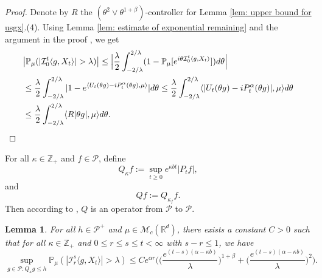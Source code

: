 \documentclass[12pt,a4paper]{amsart}
\theoremstyle{plain}
\newtheorem{lem}[thm]{Lemma}
\theoremstyle{definition}
\numberwithin{equation}{section}
\begin{document}
\begin{proof}
    Denote by $R$ the $(\theta^2\vee\theta^{1+\beta})$-controller for Lemma \ref{lem: upper bound for usgx}.(4).
    Using Lemma \ref{lem: estimate of exponential remaining} and the argument in the proof \cite[Theorem 3.3.6]{Durrett2010Probability}, we get
\begin{equation}\begin{split}
    &\big|\mathbb P_\mu (|\mathcal{I}_0^t\langle g,X_t\rangle| > \lambda)\big|
    \leq \Big|\frac{\lambda}{2}\int_{-2/\lambda}^{2/\lambda}(1 - \mathbb P_\mu[e^{i\theta \mathcal{I}_0^t\langle g,X_t\rangle}])d\theta\Big|
    \\&\leq \frac{\lambda}{2}\int_{-2/\lambda}^{2/\lambda}|1-e^{\langle U_t(\theta g)-iP^\alpha_t (\theta g),\mu \rangle}|d\theta
    \leq \frac{\lambda}{2}\int_{-2/\lambda}^{2/\lambda}\langle |U_t(\theta g) - iP^\alpha_t(\theta g)|,\mu\rangle d\theta
    \\&\leq \frac{\lambda}{2}\int_{-2/\lambda}^{2/\lambda}\langle R|\theta g|,\mu\rangle d\theta.
      \qedhere
\end{split}\end{equation}
\end{proof}
    For all $\kappa \in \mathbb Z_+$ and $f\in \mathcal P$, define
\begin{equation}\label{Q_k}
Q_\kappa f := \sup_{t\geq 0} e^{\kappa b t}|P_t f|,
\end{equation}
and
\begin{equation}\label{Q}
Q f:= Q_{\kappa_f}f.
\end{equation}
    Then according to \cite[Fact 1.2]{MM}, $Q$ is an operator from $\mathcal P$ to $\mathcal P$.
\begin{lem}\label{lem: temp}
    For all $h \in \mathcal P^+$ and $\mu \in \mathcal M_c(\mathbb R^d)$, there exists a constant $C > 0$ such that for all $\kappa \in \mathbb Z_+ $ and $0\leq r\leq s\leq t<\infty$ with $s-r \leq 1$, we have
\[
    \sup_{g \in \mathcal P: Q_\kappa g\leq h}\mathbb P_{\mu}(|\mathcal I_r^s\langle g, X_t\rangle|>\lambda)
       \leq C e^{\alpha r} \bigg(\Big( \frac{e^{(t-s)(\alpha - \kappa b)}}{\lambda}\Big)^{1+\beta} + \Big( \frac{e^{(t-s)(\alpha - \kappa b)}}{\lambda}\Big)^{2} \bigg).
\]
   \end{lem}
\end{document}
